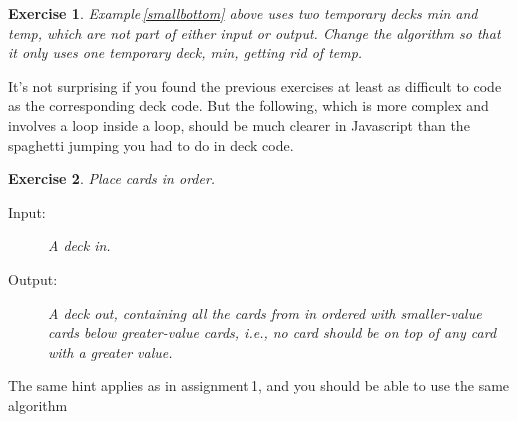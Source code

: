 \documentclass[a4paper,twoside]{tufte-handout}
\newtheorem{exercise}{Exercise}
\begin{document}
\begin{exercise}
  Example\,\ref{smallbottom} above uses two temporary decks \emph{min}
  and \emph{temp}, which are not part of either input or
  output. Change the algorithm so that it only uses one temporary
  deck, \emph{min}, getting rid of \emph{temp}.
\end{exercise}

It's not surprising if you found the previous exercises at least as
difficult to code as the corresponding deck code. But the following,
which is more complex and involves a loop inside a loop, should be
much clearer in Javascript than the spaghetti jumping you had to do in deck
code.

\begin{exercise}
  Place cards in order.
  \begin{description}
  \item[Input:] A deck \emph{in}.
  \item[Output:] A deck \emph{out}, containing all the cards from
    \emph{in} ordered with smaller-value cards below greater-value
    cards, i.e., no card should be on top of any card with a greater
    value.
  \end{description}
\end{exercise}

The same hint applies as in assignment\,1, and you should be able to
use the same algorithm
\end{document}
